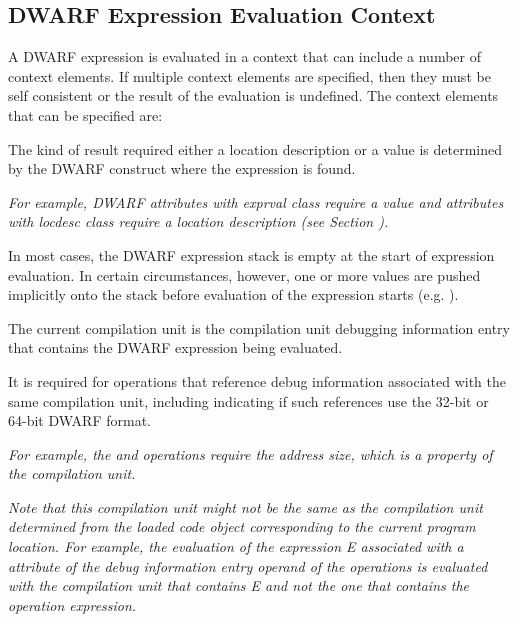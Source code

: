 \subsection{DWARF Expression Evaluation Context}
\label{chap:expressionevaluationcontext}
A DWARF expression is evaluated in a context that can include a number
of context elements. If multiple context elements are specified, then
they must be self consistent or the result of the evaluation is
undefined. The context elements that can be specified are:
\begin{enumerate}[1. ]

 The kind of result required
  \textemdash either a location description or a value \textemdash is
  determined by the DWARF construct where the expression is found.

\textit{For example, DWARF attributes with exprval class require a
  value and attributes with locdesc class require a location
  description (see Section ).}


In most cases, the DWARF expression stack is empty at the start of
expression evaluation. In certain circumstances, however, one or more
values are pushed implicitly onto the stack before evaluation of the
expression starts (e.g. \DWATdatalocation).


The current compilation unit is the compilation unit debugging
information entry that contains the DWARF expression being evaluated.

It is required for operations that reference debug information
associated with the same compilation unit, including indicating if
such references use the 32-bit or 64-bit DWARF format.

\textit{For example, the \DWOPconstx and \DWOPaddrx operations require
  the address size, which is a property of the compilation unit.}

\textit{Note that this compilation unit might not be the same as the
  compilation unit determined from the loaded code object
  corresponding to the current program location. For example, the
  evaluation of the expression E associated with a \DWATlocation
  attribute of the debug information entry operand of the \DWOPcallX
  operations is evaluated with the compilation unit that contains E
  and not the one that contains the \DWOPcallX operation expression.}


\end{enumerate}
